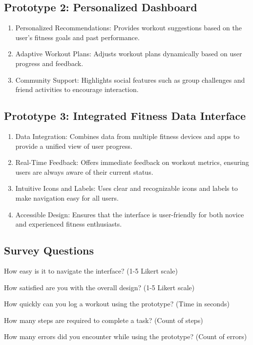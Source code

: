 \documentclass[
	letterpaper, %
]{jdf}
\begin{document}
\subsection{Prototype 2: Personalized Dashboard}
\begin{enumerate}
        \item Personalized Recommendations: Provides workout suggestions based on the user's fitness goals and past performance.
        \item Adaptive Workout Plans: Adjusts workout plans dynamically based on user progress and feedback.
        \item Community Support: Highlights social features such as group challenges and friend activities to encourage interaction.
\end{enumerate}

\subsection{Prototype 3: Integrated Fitness Data Interface}
\begin{enumerate}
        \item Data Integration: Combines data from multiple fitness devices and apps to provide a unified view of user progress.
        \item Real-Time Feedback: Offers immediate feedback on workout metrics, ensuring users are always aware of their current status.
        \item Intuitive Icons and Labels: Uses clear and recognizable icons and labels to make navigation easy for all users.
        \item Accessible Design: Ensures that the interface is user-friendly for both novice and experienced fitness enthusiasts.
\end{enumerate}

\subsection{Survey Questions}

How easy is it to navigate the interface? (1-5 Likert scale)

How satisfied are you with the overall design? (1-5 Likert scale)

How quickly can you log a workout using the prototype? (Time in seconds)

How many steps are required to complete a task? (Count of steps)

How many errors did you encounter while using the prototype? (Count of errors)
\end{document}
